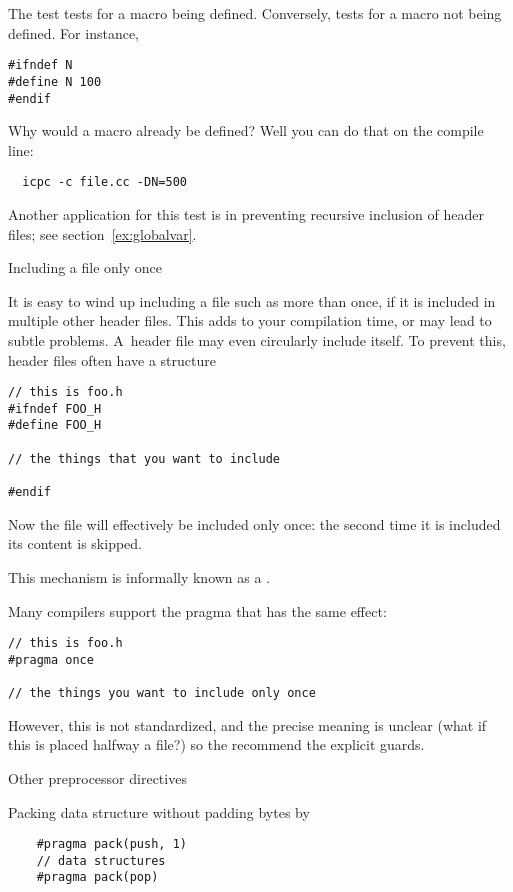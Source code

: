 The 
test tests for a macro being defined. Conversely,
tests for a macro not being defined. For instance,
\begin{lstlisting}
#ifndef N
#define N 100
#endif
\end{lstlisting}
Why would a macro already be defined? Well you can do that on the
compile line:
\begin{lstlisting}
  icpc -c file.cc -DN=500
\end{lstlisting}

Another application for this test is in preventing recursive inclusion
of header files; see section~\ref{ex:globalvar}.


 {Including a file only once}
\label{sec:cpp-once}

It is easy to wind up including a file such as  more than
once, if it is included in multiple other header files. This adds to
your compilation time, or may lead to subtle problems. A~header file
may even circularly include itself. To prevent this, header files
often have a structure%
\begin{lstlisting}
// this is foo.h
#ifndef FOO_H
#define FOO_H

// the things that you want to include

#endif
\end{lstlisting}
Now the file will effectively be included only once: the second time
it is included its content is skipped.

This mechanism is informally known as a .

Many compilers support the pragma
that has the same effect:
\begin{lstlisting}
// this is foo.h
#pragma once

// the things you want to include only once
\end{lstlisting}
However, this is not standardized, and the precise meaning is unclear
(what if this is placed halfway a file?)
so the  recommend the explicit guards.

 {Other preprocessor directives}

Packing data structure without padding bytes by 
  \begin{lstlisting}
    #pragma pack(push, 1)
    // data structures
    #pragma pack(pop)
  \end{lstlisting}

